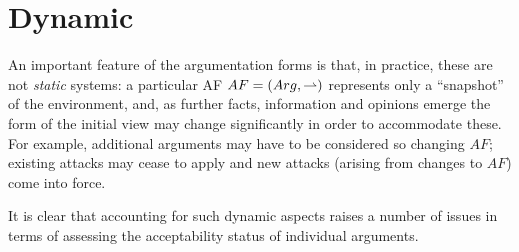 
\section{Dynamic}

An important feature of the argumentation forms is that, in practice, these are not \textit{static} systems:
% 
a particular AF $AF=(Arg,\rightharpoonup)$ 
represents only a  ``snapshot'' of the environment, 
and, as further facts, 
information and opinions emerge the form of the initial view may change significantly in order to accommodate these. 
% 
For example, 
additional arguments may have to be considered so changing $AF$; 
existing attacks may cease to apply and new attacks (arising from changes to $AF$) come into force.


It is clear that accounting for such dynamic aspects raises a number of issues in terms of assessing the acceptability status of individual arguments.




















